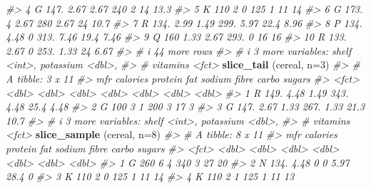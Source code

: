 \documentclass[
]{book}
\newenvironment{Shaded}{\begin{snugshade}}{\end{snugshade}}
\newcommand{\AttributeTok}[1]{\textcolor[rgb]{0.13,0.29,0.53}{#1}}
\newcommand{\CommentTok}[1]{\textcolor[rgb]{0.56,0.35,0.01}{\textit{#1}}}
\newcommand{\DecValTok}[1]{\textcolor[rgb]{0.00,0.00,0.81}{#1}}
\newcommand{\FunctionTok}[1]{\textcolor[rgb]{0.13,0.29,0.53}{\textbf{#1}}}
\newcommand{\NormalTok}[1]{#1}
\begin{document}
\begin{Shaded}
\begin{Highlighting}[]
\CommentTok{\#\textgreater{}  4 G         147.    2.67  2.67   240   2     14    13.3 }
\CommentTok{\#\textgreater{}  5 K         110     2     0      125   1     11    14   }
\CommentTok{\#\textgreater{}  6 G         173.    4     2.67   280   2.67  24    10.7 }
\CommentTok{\#\textgreater{}  7 R         134.    2.99  1.49   299.  5.97  22.4   8.96}
\CommentTok{\#\textgreater{}  8 P         134.    4.48  0      313.  7.46  19.4   7.46}
\CommentTok{\#\textgreater{}  9 Q         160     1.33  2.67   293.  0     16    16   }
\CommentTok{\#\textgreater{} 10 R         133.    2.67  0      253.  1.33  24     6.67}
\CommentTok{\#\textgreater{} \# i 44 more rows}
\CommentTok{\#\textgreater{} \# i 3 more variables: shelf \textless{}int\textgreater{}, potassium \textless{}dbl\textgreater{},}
\CommentTok{\#\textgreater{} \#   vitamins \textless{}fct\textgreater{}}
\FunctionTok{slice\_tail}\NormalTok{ (cereal, }\AttributeTok{n=}\DecValTok{3}\NormalTok{)}
\CommentTok{\#\textgreater{} \# A tibble: 3 x 11}
\CommentTok{\#\textgreater{}   mfr   calories protein   fat sodium fibre carbo sugars}
\CommentTok{\#\textgreater{}   \textless{}fct\textgreater{}    \textless{}dbl\textgreater{}   \textless{}dbl\textgreater{} \textless{}dbl\textgreater{}  \textless{}dbl\textgreater{} \textless{}dbl\textgreater{} \textless{}dbl\textgreater{}  \textless{}dbl\textgreater{}}
\CommentTok{\#\textgreater{} 1 R         149.    4.48  1.49   343.  4.48  25.4   4.48}
\CommentTok{\#\textgreater{} 2 G         100     3     1      200   3     17     3   }
\CommentTok{\#\textgreater{} 3 G         147.    2.67  1.33   267.  1.33  21.3  10.7 }
\CommentTok{\#\textgreater{} \# i 3 more variables: shelf \textless{}int\textgreater{}, potassium \textless{}dbl\textgreater{},}
\CommentTok{\#\textgreater{} \#   vitamins \textless{}fct\textgreater{}}
\FunctionTok{slice\_sample}\NormalTok{ (cereal, }\AttributeTok{n=}\DecValTok{8}\NormalTok{)}
\CommentTok{\#\textgreater{} \# A tibble: 8 x 11}
\CommentTok{\#\textgreater{}   mfr   calories protein   fat sodium fibre carbo sugars}
\CommentTok{\#\textgreater{}   \textless{}fct\textgreater{}    \textless{}dbl\textgreater{}   \textless{}dbl\textgreater{} \textless{}dbl\textgreater{}  \textless{}dbl\textgreater{} \textless{}dbl\textgreater{} \textless{}dbl\textgreater{}  \textless{}dbl\textgreater{}}
\CommentTok{\#\textgreater{} 1 G         260     6     4      340   3     27       20}
\CommentTok{\#\textgreater{} 2 N         134.    4.48  0        0   5.97  28.4      0}
\CommentTok{\#\textgreater{} 3 K         110     2     0      125   1     11       14}
\CommentTok{\#\textgreater{} 4 K         110     2     1      125   1     11       13}

\end{Highlighting}
\end{Shaded}
\end{document}
